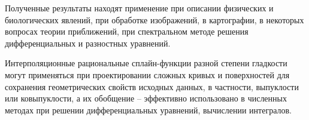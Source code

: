 Полученные результаты находят применение при описании физических и биологических явлений, при обработке изображений, в картографии, в некоторых вопросах теории приближений, при спектральном методе решения дифференциальных и разностных уравнений.

Интерполяционные рациональные сплайн-функции разной степени гладкости могут применяться при проектировании
сложных кривых и поверхностей для сохранения геометрических свойств исходных данных,
в частности, выпуклости или ковыпуклости, а их обобщение -- эффективно использовано в
 численных методах при решении дифференциальных уравнений, вычислении интегралов.




